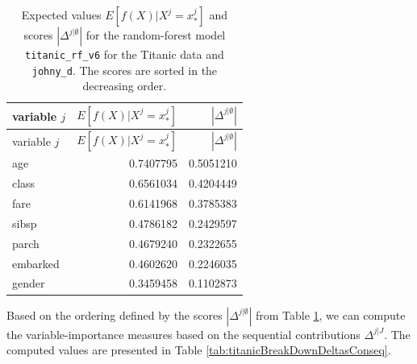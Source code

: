 \documentclass[]{krantz}
\begin{document}
\begin{longtable}[]{@{}lrr@{}}
\caption{\label{tab:titanicBreakDownDeltas} Expected values \(E[f(X) | X^j = x^j_*]\) and scores \(|\Delta^{j|\emptyset}|\) for the random-forest model \texttt{titanic\_rf\_v6} for the Titanic data and \texttt{johny\_d}. The scores are sorted in the decreasing order.}\tabularnewline
\toprule
variable \(j\) & \(E[f(X) | X^j = x^j_*]\) & \(|\Delta^{j|\emptyset}|\)\tabularnewline
\midrule
\endfirsthead
\toprule
variable \(j\) & \(E[f(X) | X^j = x^j_*]\) & \(|\Delta^{j|\emptyset}|\)\tabularnewline
\midrule
\endhead
age & 0.7407795 & 0.5051210\tabularnewline
class & 0.6561034 & 0.4204449\tabularnewline
fare & 0.6141968 & 0.3785383\tabularnewline
sibsp & 0.4786182 & 0.2429597\tabularnewline
parch & 0.4679240 & 0.2322655\tabularnewline
embarked & 0.4602620 & 0.2246035\tabularnewline
gender & 0.3459458 & 0.1102873\tabularnewline
\bottomrule
\end{longtable}

Based on the ordering defined by the scores \(|\Delta^{j|\emptyset}|\) from Table \ref{tab:titanicBreakDownDeltas}, we can compute the variable-importance measures based on the sequential contributions \(\Delta^{j|J}\). The computed values are presented in Table \ref{tab:titanicBreakDownDeltasConseq}.
\end{document}
